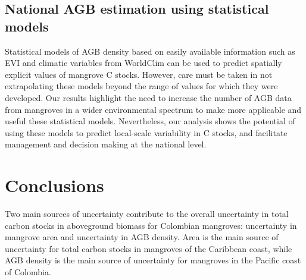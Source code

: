 \documentclass[review, authoryear]{elsarticle}   	%
\begin{document}
 
 \subsection {National AGB estimation using statistical models}
 Statistical models of AGB density based on easily available information such as EVI and climatic variables from WorldClim can be used to predict spatially explicit values of mangrove C stocks. However, care must be taken in not extrapolating these models beyond the range of values for which they were developed. 
Our results highlight the need to increase the number of AGB data from mangroves in a wider environmental spectrum to make more applicable and useful these statistical models. Nevertheless, our analysis shows the potential of using these models to predict local-scale variability in C stocks, and facilitate management and decision making at the national level. 


\section{Conclusions}
Two main sources of uncertainty contribute to the overall uncertainty in total carbon stocks in aboveground biomass for Colombian mangroves: uncertainty in mangrove area and uncertainty in AGB density. 
Area is the main source of uncertainty for total carbon stocks in mangroves of the Caribbean coast, while AGB density is the main source of uncertainty for mangroves in the Pacific coast of Colombia. %
\end{document}
